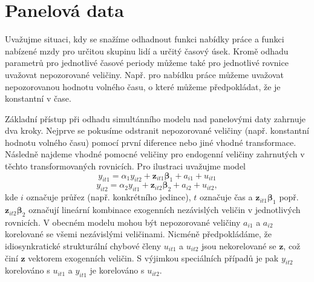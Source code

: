 \section{Panelová data}

Uvažujme situaci, kdy se snažíme odhadnout funkci nabídky práce a funkci nabízené mzdy pro určitou skupinu lidí a určitý časový úsek. Kromě odhadu parametrů pro jednotlivé časové periody můžeme také pro jednotlivé rovnice uvažovat nepozorované veličiny. Např. pro nabídku práce můžeme uvažovat nepozorovanou hodnotu volného času, o které můžeme předpokládat, že je konstantní v čase.

Základní přístup při odhadu simultánního modelu nad panelovými daty zahrnuje dva kroky. Nejprve se pokusíme odstranit nepozorované veličiny (např. konstantní hodnotu volného času) pomocí první diference nebo jiné vhodné transformace. Následně najdeme vhodné pomocné veličiny pro endogenní veličiny zahrnutých v těchto transformovaných rovnicích. Pro ilustraci uvažujme model
\begin{equation}
y_{it1} = \alpha_1 y_{it2} + \pmb{z}_{it1} \pmb{\beta}_1 + a_{i1} + u_{it1}
\end{equation}
\begin{equation}
y_{it2} = \alpha_2 y_{it1} + \pmb{z}_{it2} \pmb{\beta}_2 + a_{i2} + u_{it2},
\end{equation}
kde $i$ označuje průřez (např. konkrétního jedince), $t$ označuje čas a $\pmb{z}_{it1} \pmb{\beta}_1$ popř. $\pmb{z}_{it2} \pmb{\beta}_2$ označují lineární kombinace exogenních nezávislých veličin v jednotlivých rovnicích. V obecném modelu mohou být nepozorované veličiny $a_{i1}$ a $a_{i2}$ korelované se všemi nezávislými veličinami. Nicméně předpokládáme, že idiosynkratické strukturální chybové členy $u_{it1}$ a $u_{it2}$ jsou nekorelované se $\pmb{z}$, což činí $\pmb{z}$ vektorem exogenních veličin. S výjimkou speciálních případů je pak $y_{it2}$ korelováno s $u_{it1}$ a $y_{it1}$ je korelováno s $u_{it2}$.

